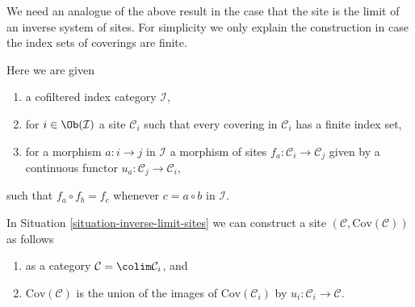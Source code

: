 \noindent
We need an analogue of the above result in the case that the site
is the limit of an inverse system of sites. For simplicity we only
explain the construction in case the index sets of coverings are finite.

\begin{situation}
\label{situation-inverse-limit-sites}
Here we are given
\begin{enumerate}
\item a cofiltered index category $\mathcal{I}$,
\item for $i \in \Ob(\mathcal{I})$ a site $\mathcal{C}_i$ such that every
covering in $\mathcal{C}_i$ has a finite index set,
\item for a morphism $a : i \to j$ in $\mathcal{I}$ a morphism of sites
$f_a : \mathcal{C}_i \to \mathcal{C}_j$ given by a continuous functor
$u_a : \mathcal{C}_j \to \mathcal{C}_i$,
\end{enumerate}
such that $f_a \circ f_b = f_c$ whenever $c = a \circ b$ in $\mathcal{I}$.
\end{situation}

\begin{lemma}
\label{lemma-colimit-sites}
In Situation \ref{situation-inverse-limit-sites} we can construct
a site $(\mathcal{C}, \text{Cov}(\mathcal{C}))$ as follows
\begin{enumerate}
\item as a category $\mathcal{C} = \colim \mathcal{C}_i$, and
\item $\text{Cov}(\mathcal{C})$ is the union of the images
of $\text{Cov}(\mathcal{C}_i)$ by $u_i : \mathcal{C}_i \to \mathcal{C}$.
\end{enumerate}
\end{lemma}

